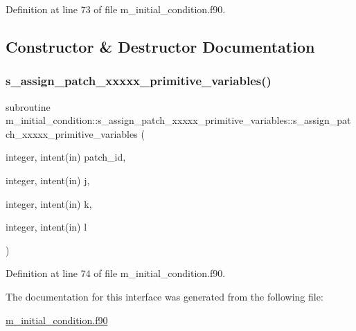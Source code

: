 Definition at line 73 of file m\+\_\+initial\+\_\+condition.\+f90.



\subsection{Constructor \& Destructor Documentation}
\mbox{\label{interfacem__initial__condition_1_1s__assign__patch__xxxxx__primitive__variables_ac27723d90d114627926a6d04b00b42f3}} 
\subsubsection{\texorpdfstring{s\+\_\+assign\+\_\+patch\+\_\+xxxxx\+\_\+primitive\+\_\+variables()}{s\_assign\_patch\_xxxxx\_primitive\_variables()}}
{\footnotesize\ttfamily subroutine m\+\_\+initial\+\_\+condition\+::s\+\_\+assign\+\_\+patch\+\_\+xxxxx\+\_\+primitive\+\_\+variables\+::s\+\_\+assign\+\_\+patch\+\_\+xxxxx\+\_\+primitive\+\_\+variables (\begin{DoxyParamCaption}\item[{integer, intent(in)}]{patch\+\_\+id,  }\item[{integer, intent(in)}]{j,  }\item[{integer, intent(in)}]{k,  }\item[{integer, intent(in)}]{l }\end{DoxyParamCaption})}



Definition at line 74 of file m\+\_\+initial\+\_\+condition.\+f90.



The documentation for this interface was generated from the following file\+:\begin{DoxyCompactItemize}
\item 
\hyperlink{m__initial__condition_8f90}{m\+\_\+initial\+\_\+condition.\+f90}\end{DoxyCompactItemize}
